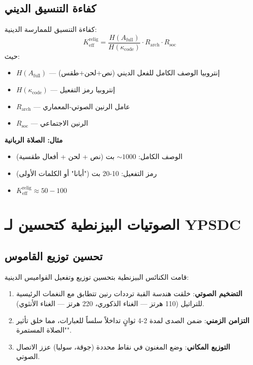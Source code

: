 \documentclass[12pt,a4paper]{article}
\begin{document}
	\subsection{كفاءة التنسيق الديني}
	
	كفاءة التنسيق للممارسة الدينية:
	\[
	K_{\mathrm{eff}}^{\mathrm{relig}} = \frac{H(A_{\mathrm{full}})}{H(\kappa_{\mathrm{code}})} \cdot R_{\mathrm{arch}} \cdot R_{\mathrm{soc}}
	\]
	حيث:
	\begin{itemize}
		\item $H(A_{\mathrm{full}})$ — إنتروبيا الوصف الكامل للفعل الديني (نص+لحن+طقس)
		\item $H(\kappa_{\mathrm{code}})$ — إنتروبيا رمز التفعيل
		\item $R_{\mathrm{arch}}$ — عامل الرنين الصوتي‐المعماري
		\item $R_{\mathrm{soc}}$ — الرنين الاجتماعي
	\end{itemize}
	
	\textbf{مثال: الصلاة الربانية}
	\begin{itemize}
		\item الوصف الكامل: $\sim 1000$ بت (نص + لحن + أفعال طقسية)
		\item رمز التفعيل: 10-20 بت ("أبانا" أو الكلمات الأولى)
		\item $K_{\mathrm{eff}}^{\mathrm{relig}} \approx 50-100$
	\end{itemize}
	
	\section{الصوتيات البيزنطية كتحسين لـ YPSDC}
	
	\subsection{تحسين توزيع القاموس}
	
	قامت الكنائس البيزنطية بتحسين توزيع وتفعيل القواميس الدينية:
	
	\begin{enumerate}
		\item \textbf{التضخيم الصوتي}: خلقت هندسة القبة ترددات رنين تتطابق مع النغمات الرئيسية للتراتيل (110 هرتز — الغناء الذكوري، 220 هرتز — الغناء الأنثوي).
		\item \textbf{التزامن الزمني}: ضمن الصدى لمدة 2-4 ثوانٍ تداخلاً سلساً للعبارات، مما خلق تأثير "الصلاة المستمرة".
		\item \textbf{التوزيع المكاني}: وضع المغنون في نقاط محددة (جوقة، سوليا) عزز الاتصال الصوتي.
	\end{enumerate}
	
\end{document}
